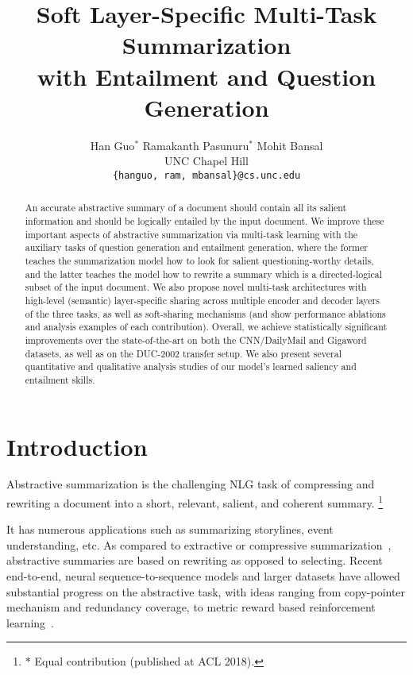 \documentclass[11pt,a4paper]{article}
\title{Soft Layer-Specific Multi-Task Summarization \\ with Entailment and Question Generation}
\author{Han Guo$^*$ \;\;\;\;\;\;\; Ramakanth Pasunuru$^*$ \;\;\;\;\;\;\; Mohit Bansal \\
  UNC Chapel Hill \\
  {\tt \{hanguo, ram, mbansal\}@cs.unc.edu} \\
 }
\date{}
\newcommand\blfootnote[1]{\begingroup
  \renewcommand\thefootnote{}\footnote{#1}\addtocounter{footnote}{-1}\endgroup
}
\begin{document}
\maketitle


\begin{abstract}
An accurate abstractive summary of a document should contain all its salient information and should be logically entailed by the input document. We improve these important aspects of abstractive summarization via multi-task learning with the auxiliary tasks of question generation and entailment generation, where the former teaches the summarization model how to look for salient questioning-worthy details, and the latter teaches the model how to rewrite a summary which is a directed-logical subset of the input document. We also propose novel multi-task architectures with high-level (semantic) layer-specific sharing across multiple encoder and decoder layers of the three tasks, as well as soft-sharing mechanisms (and show performance ablations and analysis examples of each contribution). Overall, we achieve statistically significant improvements over the state-of-the-art on both the CNN/DailyMail and Gigaword datasets, as well as on the DUC-2002 transfer setup. We also present several quantitative and qualitative analysis studies of our model's learned saliency and entailment skills. 

\end{abstract}

\section{Introduction}
\label{sec-intro}


Abstractive summarization is the challenging NLG task of compressing and rewriting a document into a short, relevant, salient, and coherent summary.\blfootnote{$*$ Equal contribution (published at ACL 2018).}
It has numerous applications such as summarizing storylines, event understanding, etc. As compared to extractive or compressive summarization~\cite{jing2000sentence,knight2002summarization,clarke2008global,filippova2015sentence,henss2015reinforcement}, abstractive summaries are based on rewriting as opposed to selecting. Recent end-to-end, neural sequence-to-sequence models and larger datasets have allowed substantial progress on the abstractive task, with ideas ranging from copy-pointer mechanism and redundancy coverage, to metric reward based reinforcement learning~\cite{rush2015neural,chopra2016abstractive,nallapati2016abstractive,see2017get}.
\end{document}

